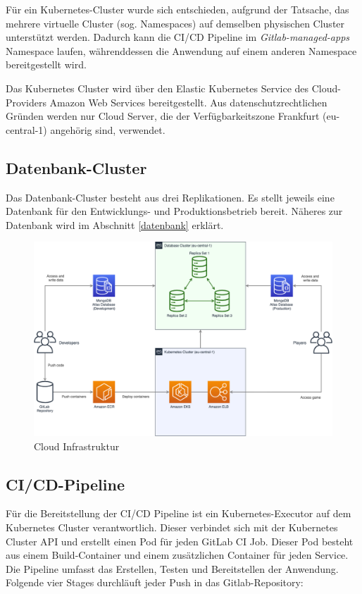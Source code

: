 \documentclass[letterpaper, 10 pt, conference]{ieeeconf}
\begin{document}
Für ein Kubernetes-Cluster wurde sich entschieden, aufgrund der Tatsache, das mehrere virtuelle Cluster (sog. Namespaces) auf demselben physischen Cluster unterstützt werden. Dadurch kann die CI/CD Pipeline im \textit{Gitlab-managed-apps} Namespace laufen, währenddessen die Anwendung auf einem anderen Namespace bereitgestellt wird.

Das Kubernetes Cluster wird über den Elastic Kubernetes Service des Cloud-Providers Amazon Web Services bereitgestellt.  Aus datenschutzrechtlichen Gründen werden nur Cloud Server, die der Verfügbarkeitszone Frankfurt (eu-central-1) angehörig sind, verwendet.

\subsection{Datenbank-Cluster}
Das Datenbank-Cluster besteht aus drei Replikationen. Es stellt jeweils eine Datenbank für den Entwicklungs- und Produktionsbetrieb bereit. Näheres zur Datenbank wird im Abschnitt \ref{datenbank} erklärt.

\begin{figure}[thpb]
      \centering
      \includegraphics[scale=0.22]{images/infrastructure}
      \caption{Cloud Infrastruktur}
      \label{fig:infrastructure}
\end{figure}


\subsection{CI/CD-Pipeline}

Für die Bereitstellung der CI/CD Pipeline ist ein Kubernetes-Executor\cite{c1} auf dem Kubernetes Cluster verantwortlich.  Dieser verbindet sich mit der Kubernetes Cluster API und erstellt einen Pod für jeden GitLab CI Job. Dieser Pod besteht aus einem Build-Container und einem zusätzlichen Container für jeden Service. Die Pipeline umfasst das Erstellen, Testen und Bereitstellen der Anwendung.  Folgende vier Stages durchläuft jeder Push in das Gitlab-Repository:
\end{document}
